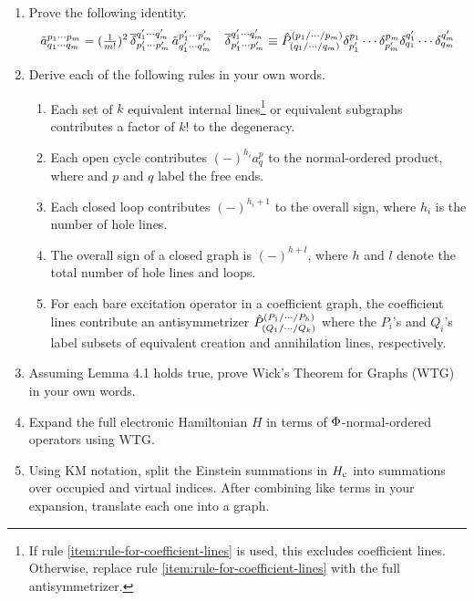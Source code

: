 \documentclass[11pt]{article}
\begin{document}
\begin{enumerate}
\item
  Prove the following identity.
\begin{align}
  \tilde{a}^{p_1\cdots p_m}_{q_1\cdots q_m}
=
  (\tfrac{1}{m!})^2\,
  \overline{\delta }_{p_1'\cdots p_m'}^{q_1'\cdots q_m'}\,
  \tilde{a}^{p_1'\cdots p_m'}_{q_1'\cdots q_m'}
&&
  \overline{\delta }^{q_1'\cdots q_m'}_{p_1'\cdots p_m'}
\equiv
  \hat{P}^{(p_1/\cdots /p_m)}
        _{(q_1/\cdots /q_m)}
  \delta ^{p_1}_{p_1'}\cdots \delta ^{p_m}_{p_m'}
  \delta ^{q_1'}_{q_1}\cdots \delta ^{q_m'}_{q_m}
\end{align}

\item
  Derive each of the following rules in your own words.
{\small
\begin{enumerate}
\item
  Each set of $k$ equivalent internal lines\footnote{If rule \ref{item:rule-for-coefficient-lines} is used, this excludes coefficient lines.  Otherwise, replace rule \ref{item:rule-for-coefficient-lines} with the full antisymmetrizer.} or equivalent subgraphs contributes a factor of $k!$ to the degeneracy.
\item
  Each open cycle contributes $(-)^{h_i}a^p_q$ to the normal-ordered product, where and $p$ and $q$ label the free ends.
\item
  Each closed loop contributes $(-)^{h_i+1}$ to the overall sign, where $h_i$ is the number of hole lines.
\item
  The overall sign of a closed graph is $(-)^{h+l}$, where $h$ and $l$ denote the total number of hole lines and loops.
\item\label{item:rule-for-coefficient-lines}
  For each bare excitation operator in a coefficient graph, the coefficient lines contribute an antisymmetrizer
  $\hat{P}^{(P_1/\cdots /P_h)}_{(Q_1/\cdots /Q_k)}$
  where the $P_i$'s and $Q_i$'s label subsets of equivalent creation and annihilation lines, respectively.
\end{enumerate}}

\item
  Assuming Lemma 4.1 holds true, prove Wick's Theorem for Graphs (WTG) in your own words.

\item
  Expand the full electronic Hamiltonian $H$ in terms of $\Phi $-normal-ordered operators using WTG.

\item
  Using KM notation, split the Einstein summations in $H_{\mathrm{c}}$ into summations over occupied and virtual indices.
  After combining like terms in your expansion, translate each one into a graph.


\end{enumerate}
\end{document}
